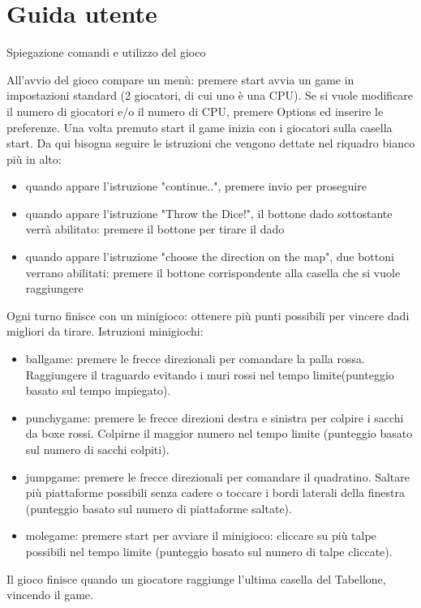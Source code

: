 \documentclass[a4paper,12pt]{report}
\begin{document}
	\appendix
	\chapter{Guida utente}

	Spiegazione comandi e utilizzo del gioco

	All'avvio del gioco compare un menù: premere start avvia un game in impostazioni standard (2 giocatori, di cui uno è una CPU).
	Se si vuole modificare il numero di giocatori e/o il numero di CPU, premere Options ed inserire le preferenze.
	Una volta premuto start il game inizia con i giocatori sulla casella start.
	Da qui bisogna seguire le istruzioni che vengono dettate nel riquadro bianco più in alto:
	\begin {itemize}
		\item quando appare l'istruzione "continue..", premere invio per proseguire
		\item quando appare l'istruzione "Throw the Dice!", il bottone dado sottostante verrà abilitato: premere il bottone per tirare il dado
		\item quando appare l'istruzione "choose the direction on the map", due bottoni verrano abilitati: premere il bottone corrispondente alla casella che si vuole raggiungere
	\end {itemize}
	Ogni turno finisce con un minigioco: ottenere più punti possibili per vincere dadi migliori da tirare.
	Istruzioni minigiochi:
	\begin {itemize}
		\item ballgame: premere le frecce direzionali per comandare la palla rossa. Raggiungere il traguardo evitando i muri rossi nel tempo limite(punteggio basato sul tempo impiegato).
		\item punchygame: premere le frecce direzioni destra e sinistra per colpire i sacchi da boxe rossi. Colpirne il maggior numero nel tempo limite (punteggio basato sul numero di sacchi colpiti).
		\item jumpgame: premere le frecce direzionali per comandare il quadratino. Saltare più piattaforme possibili senza cadere o toccare i bordi laterali della finestra (punteggio basato sul numero di piattaforme saltate).
		\item molegame: premere start per avviare il minigioco: cliccare su più talpe possibili nel tempo limite (punteggio basato sul numero di talpe cliccate).
	\end {itemize}
	Il gioco finisce quando un giocatore raggiunge l'ultima casella del Tabellone, vincendo il game.


	
	
\end{document}
